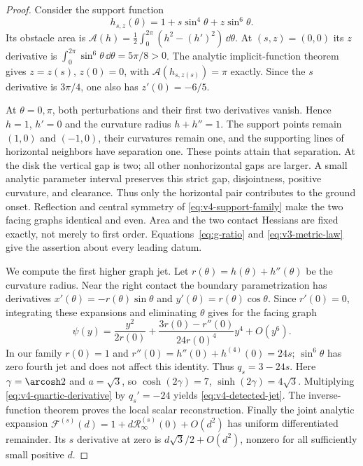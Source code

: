 \begin{proof}
Consider the support function
\begin{equation}\label{eq:v4-support-family}
 h_{s,z}(\theta)=1+s\sin^4\theta+z\sin^6\theta.
\end{equation}
Its obstacle area is
$\mathcal A(h)=\tfrac12\int_0^{2\pi}(h^2-(h')^2)\,\dd\theta$.
At $(s,z)=(0,0)$ its $z$ derivative is
$\int_0^{2\pi}\sin^6\theta\,\dd\theta=5\pi/8>0$.
The analytic implicit-function theorem gives $z=z(s)$, $z(0)=0$,
with $\mathcal A(h_{s,z(s)})=\pi$ exactly. Since the $s$ derivative
is $3\pi/4$, one also has $z'(0)=-6/5$.

At $\theta=0,\pi$, both perturbations and their first two derivatives
vanish. Hence $h=1$, $h'=0$ and the curvature radius $h+h''=1$.
The support points remain $(1,0)$ and $(-1,0)$, their curvatures
remain one, and the supporting lines of horizontal neighbors have
separation one. These points attain that separation. At the disk the
vertical gap is two; all other nonhorizontal gaps are larger. A small
analytic parameter interval preserves this strict gap, disjointness,
positive curvature, and clearance. Thus only the horizontal pair
contributes to the ground onset. Reflection and central symmetry of
\eqref{eq:v4-support-family} make the two facing graphs identical
and even. Area and the two contact Hessians are fixed exactly, not
merely to first order. Equations~\eqref{eq:g-ratio} and
\eqref{eq:v3-metric-law} give the assertion about every leading datum.

We compute the first higher graph jet. Let
$r(\theta)=h(\theta)+h''(\theta)$ be the curvature radius. Near the
right contact the boundary parametrization has derivatives
$x'(\theta)=-r(\theta)\sin\theta$ and
$y'(\theta)=r(\theta)\cos\theta$. Since $r'(0)=0$, integrating these
expansions and eliminating $\theta$ gives for the facing graph
\[
 \psi(y)=\frac{y^2}{2r(0)}+
          \frac{3r(0)-r''(0)}{24r(0)^4}y^4+O(y^6).
\]
In our family $r(0)=1$ and $r''(0)=h''(0)+h^{(4)}(0)=24s$;
$\sin^6\theta$ has zero fourth jet and does not affect this identity.
Thus $q_s=3-24s$. Here $\gamma=\arcosh2$ and $a=\sqrt3$, so
$\cosh(2\gamma)=7$, $\sinh(2\gamma)=4\sqrt3$.
Multiplying \eqref{eq:v4-quartic-derivative} by $q_s'=-24$ yields
\eqref{eq:v4-detected-jet}. The inverse-function theorem proves the
local scalar reconstruction. Finally the joint analytic expansion
$\mathcal F^{(s)}(d)=1+d\mathcal R_\infty^{(s)}(0)+O(d^2)$ has
uniform differentiated remainder. Its $s$ derivative at zero is
$d\sqrt3/2+O(d^2)$, nonzero for all sufficiently small positive $d$.
\end{proof}

